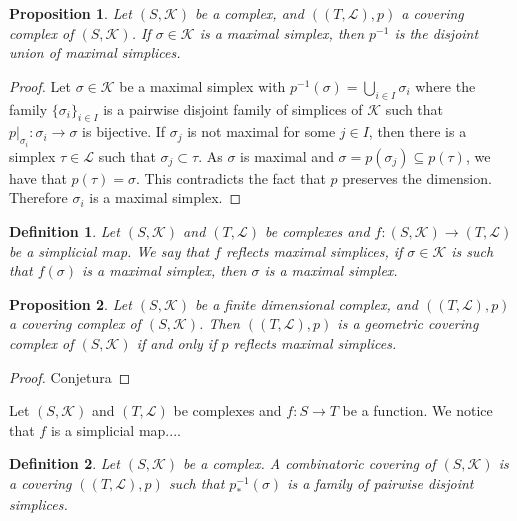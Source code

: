 \documentclass{amsart}
\newtheorem{proposition}{Proposition}[section]
\newtheorem{definition}{Definition}[section]
\begin{document}
\begin{proposition}
Let $(S,\mathcal{K})$ be a complex, and $((T,\mathcal{L}),p)$ a covering complex of $(S,\mathcal{K})$. If $\sigma\in\mathcal{K}$ is a maximal simplex, then $p^{-1}$ is the disjoint union of maximal simplices.
\end{proposition}

\begin{proof}
Let $\sigma\in\mathcal{K}$ be a maximal simplex with  $p^{-1}(\sigma)=\bigcup_{i\in I}\sigma_i$ where the family $\{\sigma_i\}_{i\in I}$ is a pairwise disjoint family of simplices of $\mathcal{K}$ such that $p|_{\sigma_i}\colon \sigma_i\longrightarrow \sigma$ is bijective. If $\sigma_j$ is not maximal for some $j\in I$, then there is a simplex $\tau\in\mathcal{L}$ such that $\sigma_j\subset \tau$. As $\sigma$ is maximal and $\sigma=p(\sigma_j)\subseteq p(\tau)$, we have that $p(\tau)=\sigma$. This contradicts the fact that $p$ preserves the dimension. Therefore $\sigma_i$ is a maximal simplex.
\end{proof}

\begin{definition}
Let  $(S,\mathcal{K})$ and $(T,\mathcal{L})$ be complexes and $f\colon (S,\mathcal{K})\longrightarrow (T,\mathcal{L})$ be a simplicial map. We say that $f$ reflects maximal simplices, if $\sigma\in\mathcal{K}$ is such that $f(\sigma)$ is a maximal simplex, then $\sigma$ is a maximal simplex.
\end{definition}


\begin{proposition}
Let $(S,\mathcal{K})$ be a finite dimensional complex, and $((T,\mathcal{L}),p)$ a covering complex of $(S,\mathcal{K})$. Then $((T,\mathcal{L}),p)$ is a geometric covering complex of $(S,\mathcal{K})$ if and only if $p$ reflects maximal simplices.
\end{proposition}

\begin{proof}
Conjetura
\end{proof}

Let $(S,\mathcal{K})$ and $(T,\mathcal{L})$ be complexes and $f\colon S\longrightarrow T$ be a function. We notice that $f$ is a simplicial map....

\begin{definition}
Let $(S,\mathcal{K})$ be a complex. A combinatoric covering of $(S,\mathcal{K})$ is a covering $((T,\mathcal{L}),p)$ such that $p_*^{-1}(\sigma)$ is a family of pairwise disjoint simplices.
\end{definition}
\end{document}
